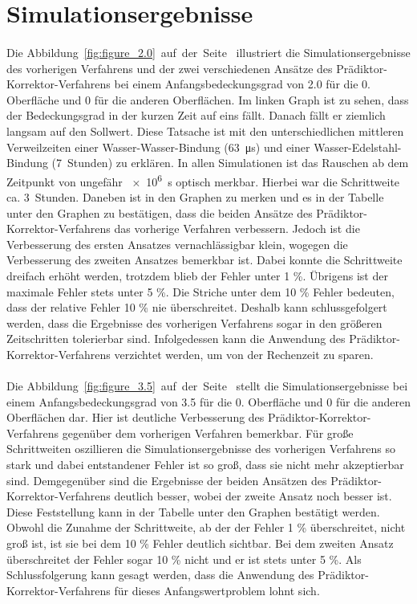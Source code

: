 \documentclass{listhesis}
\begin{document}
\section{Simulationsergebnisse} \label{section:simuergebnisse}
\paragraph{}
Die Abbildung~\ref{fig:figure_2.0}~auf~der~Seite~\pageref{fig:figure_2.0} illustriert die Simulationsergebnisse des vorherigen Verfahrens und der zwei verschiedenen Ansätze des Prädiktor-Korrektor-Verfahrens bei einem Anfangsbedeckungsgrad von 2.0 für die 0. Oberfläche und 0 für die anderen Oberflächen. Im linken Graph ist zu sehen, dass der Bedeckungsgrad in der kurzen Zeit auf eins fällt. Danach fällt er ziemlich langsam auf den Sollwert. Diese Tatsache ist mit den unterschiedlichen mittleren Verweilzeiten einer Wasser-Wasser-Bindung (\SI{63}{\micro\s}) und einer Wasser-Edelstahl-Bindung (\SI{7}{Stunden}) zu erklären. In allen Simulationen ist das Rauschen ab dem Zeitpunkt von ungefähr \SI{e6}{\s} optisch merkbar. Hierbei war die Schrittweite ca. \SI{3}{Stunden}. Daneben ist in den Graphen zu merken und es in der Tabelle unter den Graphen zu bestätigen, dass die beiden Ansätze des Prädiktor-Korrektor-Verfahrens das vorherige Verfahren verbessern. Jedoch ist die Verbesserung des ersten Ansatzes vernachlässigbar klein, wogegen die Verbesserung des zweiten Ansatzes bemerkbar ist. Dabei konnte die Schrittweite dreifach erhöht werden, trotzdem blieb der Fehler unter 1 \%. Übrigens ist der maximale Fehler stets unter 5 \%. Die Striche unter dem 10 \% Fehler bedeuten, dass der relative Fehler 10 \% nie überschreitet. Deshalb kann schlussgefolgert werden, dass die Ergebnisse des vorherigen Verfahrens sogar in den größeren Zeitschritten tolerierbar sind. Infolgedessen kann die Anwendung des Prädiktor-Korrektor-Verfahrens verzichtet werden, um von der Rechenzeit zu sparen.

\paragraph{}
Die Abbildung~\ref{fig:figure_3.5}~auf~der~Seite~\pageref{fig:figure_3.5} stellt die Simulationsergebnisse bei einem Anfangsbedeckungsgrad von 3.5 für die 0. Oberfläche und 0 für die anderen Oberflächen dar. Hier ist deutliche Verbesserung des Prädiktor-Korrektor-Verfahrens gegenüber dem vorherigen Verfahren bemerkbar. Für große Schrittweiten oszillieren die Simulationsergebnisse des vorherigen Verfahrens so stark und dabei entstandener Fehler ist so groß, dass sie nicht mehr akzeptierbar sind. Demgegenüber sind die Ergebnisse der beiden Ansätzen des Prädiktor-Korrektor-Verfahrens deutlich besser, wobei der zweite Ansatz noch besser ist. Diese Feststellung kann in der Tabelle unter den Graphen bestätigt werden. Obwohl die Zunahme der Schrittweite, ab der der Fehler 1 \% überschreitet, nicht groß ist, ist sie bei dem 10 \% Fehler deutlich sichtbar. Bei dem zweiten Ansatz überschreitet der Fehler sogar 10 \% nicht und er ist stets unter 5 \%. Als Schlussfolgerung kann gesagt werden, dass die Anwendung des Prädiktor-Korrektor-Verfahrens für dieses Anfangswertproblem lohnt sich.
\end{document}
